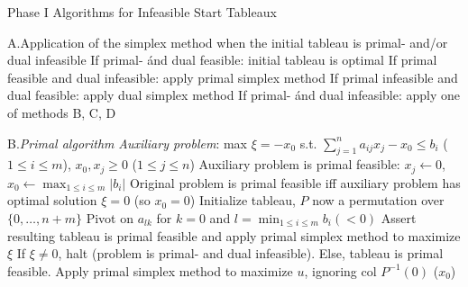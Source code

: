 \beginsection Phase I Algorithms for Infeasible Start Tableaux

\item{A.}Application of the simplex method when the initial tableau is primal-
and/or dual infeasible\smallskip
{}If primal- \'and dual feasible: initial tableau is optimal\smallskip
{}If primal feasible and dual infeasible: apply primal simplex method
\smallskip
{}If primal infeasible and dual feasible: apply dual simplex method
\smallskip
{}If primal- \'and dual infeasible: apply one of methods B, C, D
\smallskip
\item{B.}\emph{Primal algorithm}\smallskip
{}\emph{Auxiliary problem}:
max $\xi=-x_0$ s.t. $\sum_{j=1}^na_{ij}x_j-x_0\leq b_i$ ($1\leq i\leq m$),
$x_0,x_j\geq 0$ ($1\leq j\leq n$)\smallskip
{}Auxiliary problem is primal feasible: $x_j\leftarrow 0$, $x_0
\leftarrow\max_{1\leq i\leq m}|b_i|$\smallskip
{}Original problem is primal feasible iff auxiliary problem has
optimal solution $\xi=0$ (so $x_0=0$)\smallskip
{}Initialize tableau, $P$ now a permutation over $\{0,\ldots,n+m\}$
\smallskip
\iitem{}\vbox{\offinterlineskip
}\smallskip
{}Pivot on $a_{lk}$ for $k=0$ and $l=\min_{1\leq i\leq m}b_i(<0)$
\smallskip
{}Assert resulting tableau is primal feasible and apply primal simplex
method to maximize $\xi$\smallskip
{}If $\xi\not=0$, halt (problem is primal- and dual infeasible). Else,
tableau is primal feasible.
\smallskip
{}Apply primal simplex method to maximize $u$, ignoring col $P^{-1}(0)$
($x_0$)\smallskip
\smallskip

